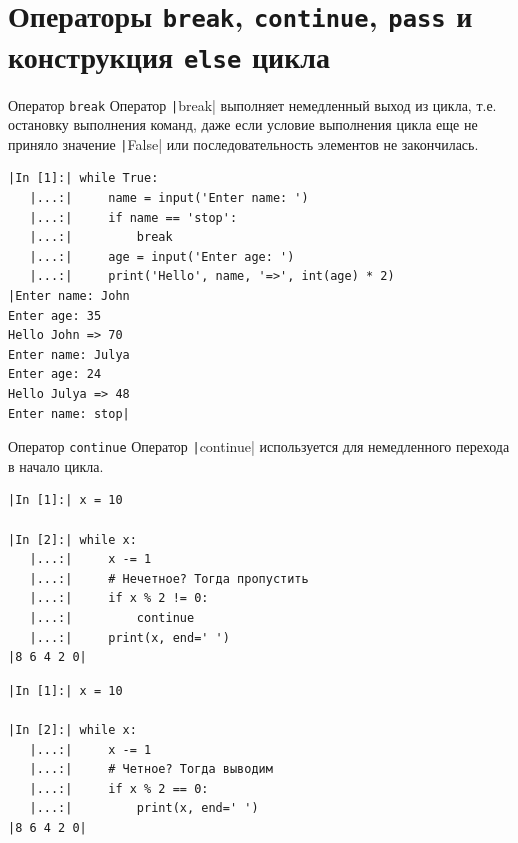 \documentclass[aspectratio=169]{beamer}	%
\begin{document}
\section{Операторы \texttt{break}, \texttt{continue}, \texttt{pass} и \\ конструкция \texttt{else} цикла}
\sectionframe


\begin{frame}[fragile]{Оператор \texttt{break}}
\scriptsize
Оператор \texttt|break| выполняет немедленный выход из цикла, т.е. остановку выполнения команд, даже если условие выполнения цикла еще не приняло значение \texttt|False| или последовательность элементов не закончилась.

\begin{verbatim}
|In [1]:| while True:
   |...:|     name = input('Enter name: ')
   |...:|     if name == 'stop':
   |...:|         break
   |...:|     age = input('Enter age: ')
   |...:|     print('Hello', name, '=>', int(age) * 2)
|Enter name: John
Enter age: 35
Hello John => 70
Enter name: Julya
Enter age: 24
Hello Julya => 48
Enter name: stop|
\end{verbatim}
\vfill	
\end{frame}


\begin{frame}[fragile]{Оператор \texttt{continue}}
\scriptsize	
Оператор \texttt|continue| используется для немедленного перехода в начало цикла.

\begin{multicols}{2}

\begin{verbatim}
|In [1]:| x = 10

|In [2]:| while x:
   |...:|     x -= 1
   |...:|     # Нечетное? Тогда пропустить
   |...:|     if x % 2 != 0: 
   |...:|         continue  
   |...:|     print(x, end=' ')
|8 6 4 2 0|
\end{verbatim}

\columnbreak

\begin{verbatim}
|In [1]:| x = 10

|In [2]:| while x:
   |...:|     x -= 1
   |...:|     # Четное? Тогда выводим
   |...:|     if x % 2 == 0:   
   |...:|         print(x, end=' ')
|8 6 4 2 0|
\end{verbatim}

\end{multicols}
\vfill
\end{frame}
\end{document}
